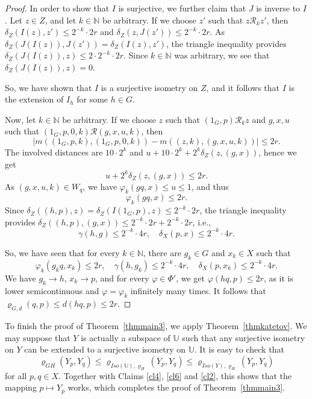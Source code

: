 \documentclass[a4paper]{amsart}
\theoremstyle{plain}
\theoremstyle{remark}
\begin{document}
\begin{proof}
In order to show that $ I $ is surjective, we further claim that $ J $ is inverse to $ I $. Let $ z \in Z $, and let $ k \in \mathbb{N} $ be arbitrary. If we choose $ z' $ such that $ z \mathcal{R}_{k} z' $, then $ \delta_{Z}(I(z), z') \leq 2^{-k} \cdot 2r $ and $ \delta_{Z}(z, J(z')) \leq 2^{-k} \cdot 2r $. As $ \delta_{Z}(J(I(z)), J(z')) = \delta_{Z}(I(z), z') $, the triangle inequality provides $ \delta_{Z}(J(I(z)), z) \leq 2 \cdot 2^{-k} \cdot 2r $. Since $ k \in \mathbb{N} $ was arbitrary, we see that $ \delta_{Z}(J(I(z)), z) = 0 $.

So, we have shown that $ I $ is a surjective isometry on $ Z $, and it follows that $ I $ is the extension of $ I_{h} $ for some $ h \in G $.

Now, let $ k \in \mathbb{N} $ be arbitrary. If we choose $ z $ such that $ (1_{G}, p) \mathcal{R}_{k} z $ and $ g, x, u $ such that $ (1_{G}, p, 0, k) \mathcal{R} (g, x, u, k) $, then
$$ \big| m((1_{G}, p, k), (1_{G}, p, 0, k)) - m((z, k), (g, x, u, k)) \big| \leq 2r. $$
The involved distances are $ 10 \cdot 2^{k} $ and $ u + 10 \cdot 2^{k} + 2^{k} \delta_{Z}(z, (g, x)) $, hence we get
$$ u + 2^{k} \delta_{Z}(z, (g, x)) \leq 2r. $$
As $ (g, x, u, k) \in W_{q} $, we have $ \varphi_{k}(gq, x) \leq u \leq 1 $, and thus
$$ \varphi_{k}(gq, x) \leq 2r. $$
Since $ \delta_{Z}((h, p), z) = \delta_{Z}(I(1_{G}, p), z) \leq 2^{-k} \cdot 2r $, the triangle inequality provides $ \delta_{Z}((h, p), (g, x)) \leq 2^{-k} \cdot 2r + 2^{-k} \cdot 2r $, i.e.,
$$ \gamma(h, g) \leq 2^{-k} \cdot 4r, \quad \delta_{X}(p, x) \leq 2^{-k} \cdot 4r. $$

So, we have seen that for every $ k \in \mathbb{N} $, there are $ g_{k} \in G $ and $ x_{k} \in X $ such that
$$ \varphi_{k}(g_{k}q, x_{k}) \leq 2r, \quad \gamma(h, g_{k}) \leq 2^{-k} \cdot 4r, \quad \delta_{X}(p, x_{k}) \leq 2^{-k} \cdot 4r. $$
We have $ g_{k} \to h $, $ x_{k} \to p $, and for every $ \varphi \in \Phi' $, we get $ \varphi(hq, p) \leq 2r $, as it is lower semicontinuous and $ \varphi = \varphi_{k} $ infinitely many times. It follows that $ \varrho_{G, d}(q, p) \leq d(hq, p) \leq 2r $.
\end{proof}


To finish the proof of Theorem~\ref{thmmain3}, we apply Theorem~\ref{thmkatetov}. We may suppose that $ Y $ is actually a subspace of $ \mathbb{U} $ such that any surjective isometry on $ Y $ can be extended to a surjective isometry on $ \mathbb{U} $. It is easy to check that
$$ \varrho_{GH}(Y_{p}, Y_{q}) \leq \varrho_{Iso(\mathbb{U}), \varrho_{H}}(Y_{p}, Y_{q}) \leq \varrho_{Iso(Y), \varrho_{H}}(Y_{p}, Y_{q}) $$
for all $ p, q \in X $. Together with Claims \ref{cl4}, \ref{cl6} and \ref{cl2}, this shows that the mapping $ p \mapsto Y_{p} $ works, which completes the proof of Theorem~\ref{thmmain3}.
\end{document}
